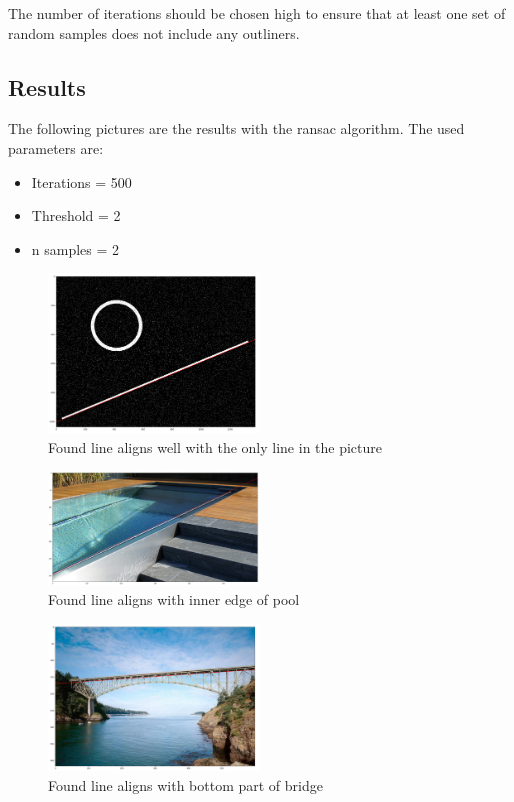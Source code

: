 \documentclass[12pt]{article}
\begin{document}
The number of iterations should be chosen high to ensure that at least one set of random samples does not include any outliners. 

\pagebreak
\subsection{Results}
The following pictures are the results with the ransac algorithm. The used parameters are:
\begin{itemize}
    \item Iterations = 500
    \item Threshold = 2
    \item n samples = 2
    \end{itemize}

\begin{figure}[!htb]
    \centering
    \includegraphics[width=0.5\textwidth]{pics/synthetic}
    \caption{Found line aligns well with the only line in the picture}
    \end{figure}

    \begin{figure}[!htb]
        \centering
        \includegraphics[width=0.5\textwidth]{pics/pool}
        \caption{Found line aligns with inner edge of pool}
        \end{figure}

\pagebreak

\begin{figure}[!htb]
    \centering
    \includegraphics[width=0.5\textwidth]{pics/bridge}
    \caption{Found line aligns with bottom part of bridge}
    \end{figure}
\end{document}
